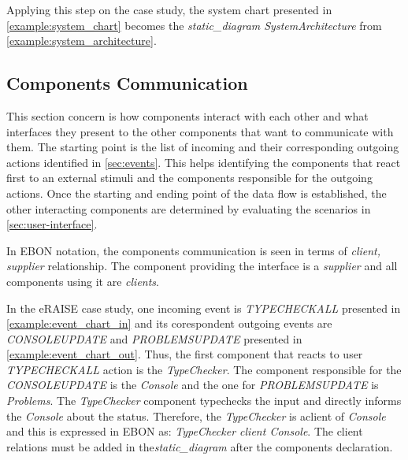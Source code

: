 \documentclass[conference]{IEEEtran}
\newcommand{\note}[1]{\todo[inline,color=red!40]{#1}}
\begin{document}


Applying this step on the case study, the system chart presented in
\autoref{example:system_chart} becomes the \emph{static\_diagram
SystemArchitecture} from
\autoref{example:system_architecture}.


%
\subsection{Components Communication}
\label{sec:comp-comm}

This section concern is how components interact with each other and
what interfaces they present to the other components that want to
communicate with them. The starting point is the list of incoming and
their corresponding outgoing actions identified in
\autoref{sec:events}. This helps identifying the components that react
first to an external stimuli and the components responsible for the
outgoing actions. Once the starting and ending point of the data flow
is established, the other interacting components are determined by
evaluating the scenarios in \autoref{sec:user-interface}. 

In EBON notation, the components communication is seen in terms of
\emph{client, supplier} relationship.  The component providing the
interface is a \emph{supplier} and all components using it are
\emph{clients}.

In the eRAISE case study, one incoming event is \emph{TYPECHECKALL}
presented in \autoref{example:event_chart_in} and its corespondent
outgoing events are \emph{CONSOLEUPDATE} and \emph{PROBLEMSUPDATE}
presented in \autoref{example:event_chart_out}.  Thus, the first
component that reacts to user \emph{TYPECHECKALL} action is the
\emph{TypeChecker}. The component responsible for the
\emph{CONSOLEUPDATE} is the \emph{Console} and the one for
\emph{PROBLEMSUPDATE} is \emph{Problems}. The \emph{TypeChecker}
component typechecks the input and directly informs the \emph{Console}
about the status.  Therefore, the \emph{TypeChecker} is aclient of
\emph{Console} and this is expressed in EBON as: \emph{ TypeChecker
  client Console}. The client relations must be added in
the\emph{static\_diagram} after the components declaration.

\end{document}
